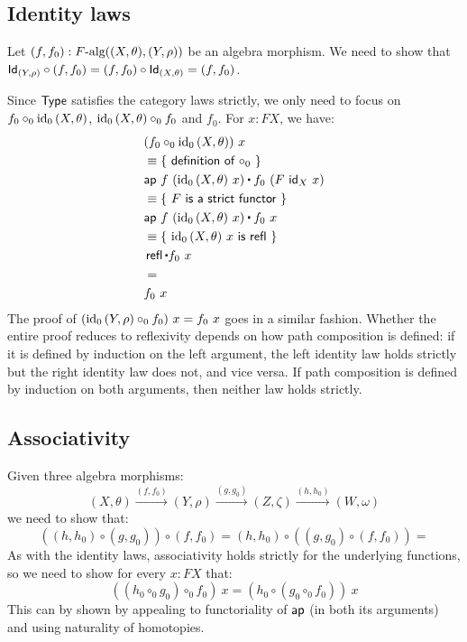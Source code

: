 \documentclass[a4paper,10pt]{report}
\begin{document}
\subsection{Identity laws}

Let $(f , f_0) : F\mbox{-alg}((X,\theta),(Y,\rho))$ be an algebra
morphism. We need to show that
$\mathsf{Id}_{(Y,\rho)} \circ (f , f_0) = (f , f_0) \circ \mathsf{Id}_{(X,\theta)} =
(f,f_0)$.

Since $\mathsf{Type}$ satisfies the category laws strictly, we only need to
focus on $f_0 \circ_0 \operatorname*{id_0}{(X,\theta)}$, $\operatorname*{id_0}{(X,\theta)} \circ_0 f_0$
and $f_0$. For $x : FX$, we have:
%
\begin{align*}
  &(f_0 \circ_0 \ido{(X,\theta)})\ x \\
  &\defeq \reasontext{definition of $\circ_0$}\\
  &\ap\ f\ (\ido{(X,\theta)}\ x) \ct f_0\ (F\ \id{X}\ x) \\
  &\defeq \reasontext{$F$ is a strict functor} \\
  &\ap\ f\ (\ido{(X,\theta)}\ x) \ct f_0\ x \\
  &\defeq \reasontext{$\ido{(X,\theta)}\ x$ is $\refl$} \\
  &\refl \ct f_0\ x \\
  &= \\
  &f_0\ x
\end{align*}
%
The proof of $(\operatorname*{id_0}{(Y,\rho)} \circ_0 f_0)\ x = f_0\ x$ goes in a similar
fashion. Whether the entire proof reduces to reflexivity depends on
how path composition is defined: if it is defined by induction on the
left argument, the left identity law holds strictly but the right
identity law does not, and vice versa. If path composition is defined
by induction on both arguments, then neither law holds strictly.

\subsection{Associativity}

Given three algebra morphisms:
$$
(X,\theta) \overset{(f,f_0)}\longrightarrow 
(Y,\rho) \overset{(g,g_0)}\longrightarrow
(Z,\zeta) \overset{(h,h_0)}\longrightarrow
(W,\omega)
$$
we need to show that:
$$
((h,h_0) \circ (g,g_0)) \circ (f,f_0) = (h,h_0) \circ ((g,g_0) \circ (f,f_0)) = 
$$
As with the identity laws, associativity holds strictly for the
underlying functions, so we need to show for every $x : FX$ that:
$$
((h_0 \circ_0 g_0) \circ_0 f_0)\ x = (h_0 \circ (g_0 \circ_0 f_0))\ x
$$
This can by shown by appealing to functoriality of $\mathsf{ap}$ (in both its
arguments) and using naturality of homotopies.
\end{document}
